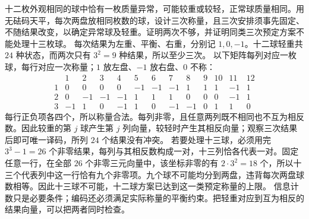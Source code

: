 十二枚外观相同的球中恰有一枚质量异常，可能较重或较轻，正常球质量相同。用无砝码天平，每次两盘放相同枚数的球，设计三次称量，且三次安排须事先固定、不随结果改变，以确定异常球及轻重。证明两次不够，并证明同类三次预定方案不能处理十三枚球。
\solution 每次结果为左重、平衡、右重，分别记 $1,0,-1$。十二球轻重共 $24$ 种状态，而两次只有 $3^2=9$ 种结果，所以至少三次。
以下矩阵每列对应一枚球，每行对应一次称量；$1$ 放左盘、$-1$ 放右盘、$0$ 不称：
\[
 \begin{array}{c|rrrrrrrrrrrr}
 &1&2&3&4&5&6&7&8&9&10&11&12\\\hline
 1&0&0&0&0&-1&-1&-1&1&1&1&-1&1\\
 2&0&-1&-1&-1&1&1&1&0&0&0&-1&1\\
 3&-1&1&0&-1&1&0&-1&-1&0&1&1&0
 \end{array}
\]
每行正负项各四个，所以称量合法。每列非零，且任意两列既不相同也不互为相反数。因此较重的第 $j$ 球产生第 $j$ 列向量，较轻时产生其相反向量；观察三次结果后即可唯一译码，所列 $24$ 个结果没有冲突。
若要处理十三球，必须用完 $3^3-1=26$ 个非零结果，每列与其相反数构成一对，十三列恰各代表一对。固定任意一行，在全部 $26$ 个非零三元向量中，该坐标非零的有 $2\cdot3^2=18$ 个，所以十三个代表列中这一行恰有九个非零项。九个球不可能均分到两盘，违背每次两盘球数相等。因此十三球不可能，十二球方案已达到这一类预定称量的上限。
\insight 信息计数只是必要条件；编码还必须满足实际称量的平衡约束。把轻重对应到互为相反的结果向量，可以把两者同时检查。
